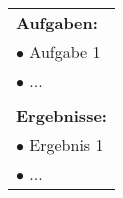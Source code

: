 \begin{table}[!h]
\begin{center}
\begin{tabular}{|p{35mm}||p{55mm}|p{50mm}||p{40mm}|}
   \multicolumn{4}{|p{150mm}|}{\textbf{Aufgaben:}}\\
   \multicolumn{4}{|p{150mm}|}{$\bullet$ Aufgabe 1}\\
   \multicolumn{4}{|p{150mm}|}{$\bullet$ ...}\\
   \multicolumn{4}{|p{150mm}|}{}\\
   \multicolumn{4}{|p{150mm}|}{\textbf{Ergebnisse:}}\\
   \multicolumn{4}{|p{150mm}|}{$\bullet$ Ergebnis 1}\\
   \multicolumn{4}{|p{150mm}|}{$\bullet$ ...}\\
   \hline
  \end{tabular}
 \end{center}
\end{table}